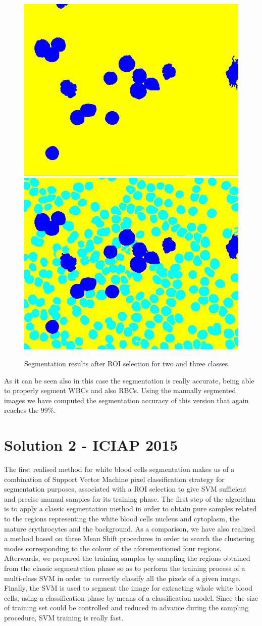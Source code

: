\documentclass[final,a4paper,12pt,english]{UnicaPhdThesis3}
\begin{document}
	\begin{figure}[!b]
		\centering
		\includegraphics[height=0.25\textwidth]{images/2015_1_caip/ROI4}
		\includegraphics[height=0.25\textwidth]{images/2015_1_caip/ROI5}
		\caption{\label{fig:ex7}Segmentation results after ROI selection for two and three classes.}
	\end{figure}
	
	As it can be seen also in this case the segmentation is really accurate, being able to properly segment WBCs and also RBCs. Using the manually segmented images we have computed the segmentation accuracy of this version that again reaches the 99\%. 
	
	\section{Solution 2 - ICIAP 2015}
	The first realised method for white blood cells segmentation makes us of a combination of Support Vector Machine pixel classification strategy for segmentation purposes, associated with a ROI selection to give SVM sufficient and precise manual samples for its training phase. 
	The first step of the algorithm is to apply a classic segmentation method in order to obtain pure samples related to the regions representing the white blood cells nucleus and cytoplasm, the mature erythrocytes and the background. As a comparison, we have also realized a method based on three Mean Shift procedures in order to search the clustering modes corresponding to the colour of the aforementioned four regions. Afterwards, we prepared the training samples by sampling the regions obtained from the classic segmentation phase so as to perform the training process of a multi-class SVM in order to correctly classify all the pixels of a given image. Finally, the SVM is used to segment the image for extracting whole white blood cells, using a classification phase by means of a classification model. Since the size of training set could be controlled and reduced in advance during the sampling procedure, SVM training is really fast.
	
\end{document}
